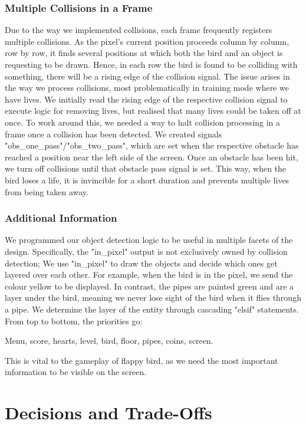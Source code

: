 \documentclass[conference]{IEEEtran}
\begin{document}
\subsubsection{Multiple Collisions in a Frame}
Due to the way we implemented collisions, each frame frequently registers multiple collisions. As the pixel's current position proceeds column by column, row by row, it finds several positions at which both the bird and an object is requesting to be drawn. Hence, in each row the bird is found to be colliding with something, there will be a rising edge of the collision signal. The issue arises in the way we process collisions, most problematically in training mode where we have lives. We initially read the rising edge of the respective collision signal to execute logic for removing lives, but realised that many lives could be taken off at once. To work around this, we needed a way to halt collision processing in a frame once a collision has been detected. We created signals "obs\_one\_pass"/"obs\_two\_pass", which are set when the respective obstacle has reached a position near the left side of the screen. Once an obstacle has been hit, we turn off collisions until that obstacle pass signal is set. This way, when the bird loses a life, it is invincible for a short duration and prevents multiple lives from being taken away.

\subsubsection{Additional Information}
We programmed our object detection logic to be useful in multiple facets of the design. Specifically, the "in\_pixel" output is not exclusively owned by collision detection; We use "in\_pixel" to draw the objects and decide which ones get layered over each other. For example, when the bird is in the pixel, we send the colour yellow to be displayed. In contrast, the pipes are painted green and are a layer under the bird, meaning we never lose sight of the bird when it flies through a pipe. We determine the layer of the entity through cascading "elsif" statements. From top to bottom, the priorities go:

Menu, score, hearts, level, bird, floor, pipes, coins, screen.

This is vital to the gameplay of flappy bird, as we need the most important information to be visible on the screen.

\section{Decisions and Trade-Offs}
\end{document}
